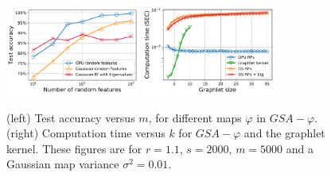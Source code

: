 \documentclass{article}
\begin{document}
\begin{figure}
\centering
		\includegraphics[width=4.4cm]{figs/phi_comparison.pdf}%
		\includegraphics[width=4.4cm]{figs/computational_comp.pdf}%
	\caption{ (left) Test accuracy versus $m$, for different maps  $\varphi$ in $GSA-\varphi$. (right) Computation time versus $k$ for $GSA-\varphi$ and the graphlet kernel. These figures are for $r=1.1$, $s=2000$, $m=5000$ and a Gaussian map variance $\sigma^2=0.01$.}
	\label{fig:diff_phi}
\end{figure}
\end{document}
